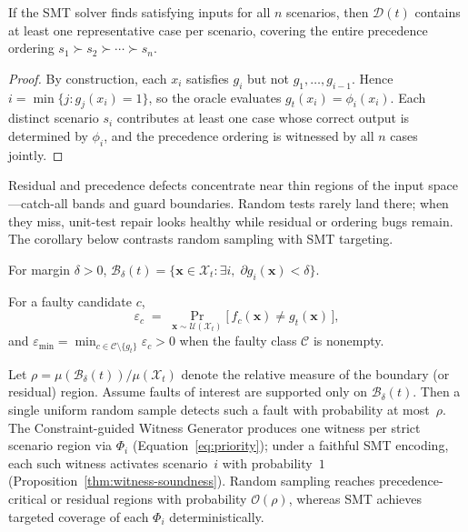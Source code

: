 \begin{lemma}
\label{lem:coverage}
If the SMT solver finds satisfying inputs for all $n$ scenarios, then
$\mathcal{D}(t)$ contains at least one representative case per scenario,
covering the entire precedence ordering $s_1 \succ s_2 \succ \cdots \succ s_n$.
\end{lemma}

\begin{proof}
By construction, each $x_i$ satisfies $g_i$ but not $g_1, \ldots, g_{i-1}$.
Hence $i = \min\{j : g_j(x_i) = 1\}$, so the oracle evaluates
$g_t(x_i) = \phi_i(x_i)$.  Each distinct scenario $s_i$
contributes at least one case whose correct output is determined by
$\phi_i$, and the precedence ordering is witnessed by all $n$ cases jointly.
\end{proof}

Residual and precedence defects concentrate near thin regions of the input
space---catch-all bands and guard boundaries.
Random tests rarely land there; when they miss, unit-test repair looks
healthy while residual or ordering bugs remain.
The corollary below contrasts random sampling with SMT targeting.

\begin{definition}
\label{def:boundary-region}
For margin $\delta > 0$,
$\mathcal{B}_\delta(t) = \{\mathbf{x} \in \mathcal{X}_t :
  \exists i,\; \partial g_i(\mathbf{x}) < \delta\}$.
\end{definition}

\begin{definition}
\label{def:fault-exposure}
For a faulty candidate $c$,
\[
  \varepsilon_c \;=\;
  \Pr_{\mathbf{x} \sim \mathcal{U}(\mathcal{X}_t)}
  \bigl[\,f_c(\mathbf{x}) \neq g_t(\mathbf{x})\,\bigr],
\]
and $\varepsilon_{\min} = \min_{c \in \mathcal{C}\setminus\{g_t\}}
\varepsilon_c > 0$ when the faulty class $\mathcal{C}$ is nonempty.
\end{definition}

\begin{corollary}
\label{cor:random-vs-smt}
Let
$\rho = \mu(\mathcal{B}_\delta(t))/\mu(\mathcal{X}_t)$
denote the relative measure of the boundary (or residual) region.
Assume faults of interest are supported only on
$\mathcal{B}_\delta(t)$.
Then a single uniform random sample detects such a fault with probability at
most~$\rho$.
The Constraint-guided Witness Generator produces one witness per strict
scenario region via $\Phi_i$ (Equation~\eqref{eq:priority}); under a faithful
SMT encoding, each such witness activates scenario~$i$ with probability~$1$
(Proposition~\ref{thm:witness-soundness}).
Random sampling reaches precedence-critical or residual regions
with probability $\mathcal{O}(\rho)$, whereas SMT achieves targeted coverage
of each $\Phi_i$ deterministically.
\end{corollary}

